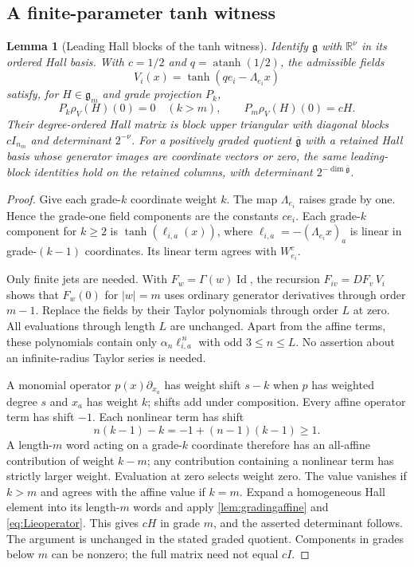 \documentclass[11pt,a4paper]{article}
\numberwithin{equation}{section}
\newtheorem{lemma}[theorem]{Lemma}
\theoremstyle{definition}
\theoremstyle{remark}
\DeclareMathOperator{\Id}{Id}
\DeclareMathOperator{\atanh}{atanh}
\newcommand{\R}{\mathbb R}
\begin{document}
\subsection{A finite-parameter tanh witness}
\begin{lemma}[Leading Hall blocks of the tanh witness]\label{lem:hallwitness}
Identify $\mathfrak g$ with $\R^\nu$ in its ordered Hall basis. With
$c=1/2$ and $q=\atanh(1/2)$, the admissible fields
\begin{equation}\label{eq:hallwitness}
 V_i(x)=\tanh(qe_i-\Lambda_{e_i}x)
\end{equation}
satisfy, for $H\in\mathfrak g_m$ and grade projection $P_k$,
\[
 P_k\rho_V(H)(0)=0\quad(k>m),\qquad
 P_m\rho_V(H)(0)=cH.
\]
Their degree-ordered Hall matrix is block upper triangular with diagonal
blocks $cI_{n_m}$ and determinant $2^{-\nu}$.
For a positively graded quotient $\overline{\mathfrak g}$ with a retained
Hall basis whose generator images are coordinate vectors or zero, the
same leading-block identities hold on the retained columns, with
determinant $2^{-\dim\overline{\mathfrak g}}$.
\end{lemma}
\begin{proof}
Give each grade-$k$ coordinate weight $k$. The map $\Lambda_{e_i}$
raises grade by one. Hence the grade-one field components are the
constants $ce_i$. Each grade-$k$ component for $k\geq2$ is
$\tanh(\ell_{i,a}(x))$, where
$\ell_{i,a}=-(\Lambda_{e_i}x)_a$ is linear in grade-$(k-1)$ coordinates.
Its linear term agrees with $W_{e_i}^c$.

Only finite jets are needed. With $F_w=\Gamma(w)\Id$, the recursion
$F_{iv}=DF_v\,V_i$ shows that $F_w(0)$ for $|w|=m$ uses ordinary
generator derivatives through order $m-1$. Replace the fields by their
Taylor polynomials through order $L$ at zero. All evaluations through
length $L$ are unchanged. Apart from the affine terms, these polynomials
contain only $\alpha_n\ell_{i,a}^{\,n}$ with odd $3\leq n\leq L$.
No assertion about an infinite-radius Taylor series is needed.

A monomial operator $p(x)\partial_{x_a}$ has weight shift $s-k$ when
$p$ has weighted degree $s$ and $x_a$ has weight $k$; shifts add under
composition. Every affine operator term has shift $-1$. Each nonlinear
term has shift
\[
 n(k-1)-k=-1+(n-1)(k-1)\geq1.
\]
A length-$m$ word acting on a grade-$k$ coordinate therefore has an
all-affine contribution of weight $k-m$; any contribution containing a
nonlinear term has strictly larger weight. Evaluation at zero selects
weight zero. The value vanishes if $k>m$ and agrees with the affine
value if $k=m$. Expand a homogeneous Hall element into its length-$m$
words and apply \cref{lem:gradingaffine} and \eqref{eq:Lieoperator}.
This gives $cH$ in grade $m$, and the asserted determinant follows.
The argument is unchanged in the stated graded quotient. Components in
grades below $m$ can be nonzero; the full matrix need not equal $cI$.
\end{proof}
\end{document}
